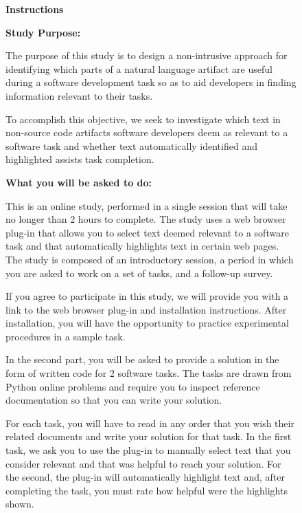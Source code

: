

\begin{figure}
\begin{mdframed}[backgroundcolor=gray!05] 
\begin{footnotesize}

{\large \textbf{Instructions}} \bigskip


\textbf{Study Purpose:} \medskip

The purpose of this study is to design a non-intrusive approach for identifying which parts of a natural language artifact are useful during a software development task so as to aid developers in finding information relevant to their tasks.

To accomplish this objective, we seek to investigate which text in non-source code artifacts software developers deem as relevant to a software task and whether text automatically identified and highlighted assists task completion.
 \medskip

\textbf{What you will be asked to do:} \medskip


This  is an online study, performed in a single session that will take no longer than 2 hours to complete. The study uses a web browser plug-in that allows you to select text deemed relevant to a software task and that automatically highlights text in certain web pages. The study is composed of an introductory session, a period in which you are asked to work on a set of tasks, and a follow-up survey.  \medskip

If you agree to participate in this study, we will provide you with a link to the web browser plug-in and installation instructions. After installation, you will have the opportunity to practice experimental procedures in a sample task. \medskip

In the second part, you will be asked to provide a solution in the form of written code for 2 software tasks. The tasks are drawn from Python online problems and require you to inspect reference documentation so that you can write your solution.  \medskip

For each task, you will have to read in any order that you wish their related documents and write your solution for that task. In the first task, we ask you to use the plug-in to manually select text that you consider relevant and that was helpful to reach your solution. For the second, the plug-in will automatically highlight text and, after completing the task, you must rate how helpful were the highlights shown.  \medskip


\end{footnotesize}
\end{mdframed}
\end{figure}
